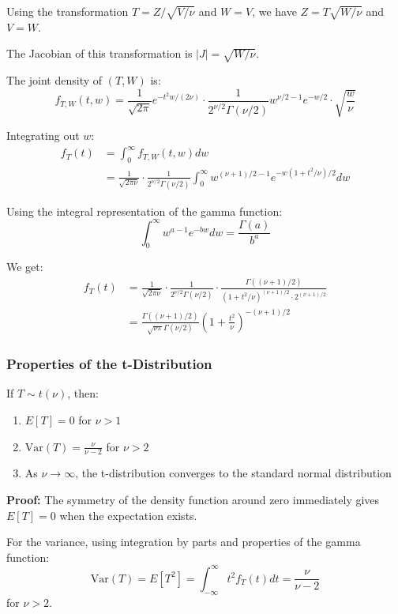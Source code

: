 \documentclass[twoside]{book}
\begin{document}
Using the transformation $T = Z/\sqrt{V/\nu}$ and $W = V$, we have $Z = T\sqrt{W/\nu}$ and $V = W$.

The Jacobian of this transformation is $|J| = \sqrt{W/\nu}$.

The joint density of $(T,W)$ is:
$$f_{T,W}(t,w) = \frac{1}{\sqrt{2\pi}} e^{-t^2w/(2\nu)} \cdot \frac{1}{2^{\nu/2}\Gamma(\nu/2)} w^{\nu/2-1} e^{-w/2} \cdot \sqrt{\frac{w}{\nu}}$$

Integrating out $w$:
\begin{align*}
f_T(t) &= \int_0^{\infty} f_{T,W}(t,w) dw\\
&= \frac{1}{\sqrt{2\pi\nu}} \cdot \frac{1}{2^{\nu/2}\Gamma(\nu/2)} \int_0^{\infty} w^{(\nu+1)/2-1} e^{-w(1+t^2/\nu)/2} dw
\end{align*}

Using the integral representation of the gamma function:
$$\int_0^{\infty} w^{a-1} e^{-bw} dw = \frac{\Gamma(a)}{b^a}$$

We get:
\begin{align*}
f_T(t) &= \frac{1}{\sqrt{2\pi\nu}} \cdot \frac{1}{2^{\nu/2}\Gamma(\nu/2)} \cdot \frac{\Gamma((\nu+1)/2)}{(1+t^2/\nu)^{(\nu+1)/2} \cdot 2^{(\nu+1)/2}}\\
&= \frac{\Gamma((\nu+1)/2)}{\sqrt{\nu\pi}\Gamma(\nu/2)} \left(1 + \frac{t^2}{\nu}\right)^{-(\nu+1)/2}
\end{align*}


\subsubsection{Properties of the t-Distribution}

\begin{textbox}
If $T \sim t(\nu)$, then:
\begin{enumerate}
\item $E[T] = 0$ for $\nu > 1$
\item $\text{Var}(T) = \frac{\nu}{\nu-2}$ for $\nu > 2$
\item As $\nu \to \infty$, the t-distribution converges to the standard normal distribution
\end{enumerate}
\end{textbox}

\textbf{Proof:} The symmetry of the density function around zero immediately gives $E[T] = 0$ when the expectation exists.

For the variance, using integration by parts and properties of the gamma function:
$$\text{Var}(T) = E[T^2] = \int_{-\infty}^{\infty} t^2 f_T(t) dt = \frac{\nu}{\nu-2}$$ for $\nu > 2$.
\end{document}
